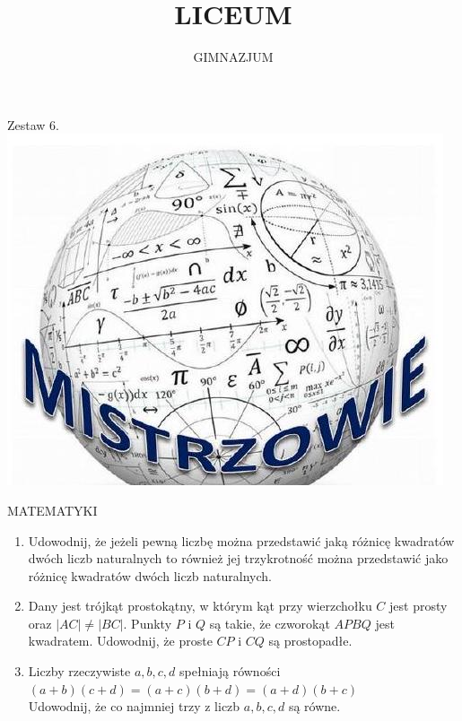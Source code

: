\documentclass[10pt]{article}
\title{LICEUM }
\author{GIMNAZJUM}
\date{}
\begin{document}
\maketitle
Zestaw 6.\\
\includegraphics[max width=\textwidth, center]{2024_11_21_da23055957b186aca865g-1}

MATEMATYKI



\begin{enumerate}
  \item Udowodnij, że jeżeli pewną liczbę można przedstawić jaką różnicę kwadratów dwóch liczb naturalnych to również jej trzykrotność można przedstawić jako różnicę kwadratów dwóch liczb naturalnych.
  \item Dany jest trójkąt prostokątny, w którym kąt przy wierzchołku \(C\) jest prosty oraz \(|A C| \neq|B C|\). Punkty \(P\) i \(Q\) są takie, że czworokąt \(A P B Q\) jest kwadratem. Udowodnij, że proste \(C P\) i \(C Q\) są prostopadłe.
  \item Liczby rzeczywiste \(a, b, c, d\) spełniają równości\\
\((a+b)(c+d)=(a+c)(b+d)=(a+d)(b+c)\)\\
Udowodnij, że co najmniej trzy z liczb \(a, b, c, d\) są równe.
\end{enumerate}
\end{document}
